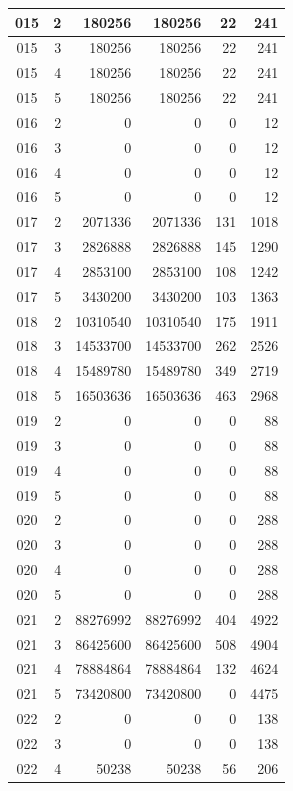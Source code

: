 \begin{longtable}{|c|r|r|r|r|r|}
\hline
015 & 2 & 180256 & 180256 & 22 & 241 \\
\hline
015 & 3 & 180256 & 180256 & 22 & 241 \\
\hline
015 & 4 & 180256 & 180256 & 22 & 241 \\
\hline
015 & 5 & 180256 & 180256 & 22 & 241 \\
\hline
016 & 2 & 0 & 0 & 0 & 12 \\
\hline
016 & 3 & 0 & 0 & 0 & 12 \\
\hline
016 & 4 & 0 & 0 & 0 & 12 \\
\hline
016 & 5 & 0 & 0 & 0 & 12 \\
\hline
017 & 2 & 2071336 & 2071336 & 131 & 1018 \\
\hline
017 & 3 & 2826888 & 2826888 & 145 & 1290 \\
\hline
017 & 4 & 2853100 & 2853100 & 108 & 1242 \\
\hline
017 & 5 & 3430200 & 3430200 & 103 & 1363 \\
\hline
018 & 2 & 10310540 & 10310540 & 175 & 1911 \\
\hline
018 & 3 & 14533700 & 14533700 & 262 & 2526 \\
\hline
018 & 4 & 15489780 & 15489780 & 349 & 2719 \\
\hline
018 & 5 & 16503636 & 16503636 & 463 & 2968 \\
\hline
019 & 2 & 0 & 0 & 0 & 88 \\
\hline
019 & 3 & 0 & 0 & 0 & 88 \\
\hline
019 & 4 & 0 & 0 & 0 & 88 \\
\hline
019 & 5 & 0 & 0 & 0 & 88 \\
\hline
020 & 2 & 0 & 0 & 0 & 288 \\
\hline
020 & 3 & 0 & 0 & 0 & 288 \\
\hline
020 & 4 & 0 & 0 & 0 & 288 \\
\hline
020 & 5 & 0 & 0 & 0 & 288 \\
\hline
021 & 2 & 88276992 & 88276992 & 404 & 4922 \\
\hline
021 & 3 & 86425600 & 86425600 & 508 & 4904 \\
\hline
021 & 4 & 78884864 & 78884864 & 132 & 4624 \\
\hline
021 & 5 & 73420800 & 73420800 & 0 & 4475 \\
\hline
022 & 2 & 0 & 0 & 0 & 138 \\
\hline
022 & 3 & 0 & 0 & 0 & 138 \\
\hline
022 & 4 & 50238 & 50238 & 56 & 206 \\
\hline

\end{longtable}
